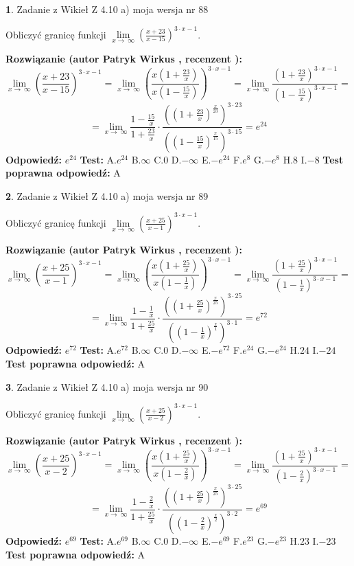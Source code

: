 \documentclass[12pt, a4paper]{article}
\theoremstyle{definition} %
\newtheorem{zad}{}
\newcommand{\zadStart}[1]{\begin{zad}#1\newline}
\newcommand{\zadStop}{\end{zad}}
\newcommand{\rozwStart}[2]{\noindent \textbf{Rozwiązanie (autor #1 , recenzent #2): }\newline}
\newcommand{\rozwStop}{\newline}
\newcommand{\odpStart}{\noindent \textbf{Odpowiedź:}\newline}
\newcommand{\odpStop}{\newline}
\newcommand{\testStart}{\noindent \textbf{Test:}\newline}
\newcommand{\testStop}{\newline}
\newcommand{\kluczStart}{\noindent \textbf{Test poprawna odpowiedź:}\newline}
\newcommand{\kluczStop}{\newline}
\begin{document}
\zadStart{Zadanie z Wikieł Z 4.10 a) moja wersja nr 88}

Obliczyć granicę funkcji  $\lim\limits_{x\to\ \infty}(\frac{x+23}{x-15})^{3\cdot x-1}$.
\zadStop
\rozwStart{Patryk Wirkus}{}
$$\lim\limits_{x\to\ \infty}(\frac{x+23}{x-15})^{3\cdot x-1} = \lim\limits_{x\to\ \infty}(\frac{x(1+\frac{23}{x})}{x(1-\frac{15}{x})})^{3\cdot x-1}=\lim\limits_{x\to\ \infty}\frac{(1+\frac{23}{x})^{3\cdot x-1}}{(1-\frac{15}{x})^{3\cdot x-1}}=$$
$$=\lim\limits_{x\to\ \infty}\frac{1-\frac{15}{x}}{1+\frac{23}{x}}\cdot\frac{((1+\frac{23}{x})^{\frac{x}{23}})^{3\cdot23}}{((1-\frac{15}{x})^{\frac{x}{15}})^{3\cdot15}}=e^{24}$$
\rozwStop
\odpStart
$e^{24}$
\odpStop
\testStart
A.$e^{24}$ B.$\infty$ C.$0$ D.$-\infty$ E.$-e^{24}$
F.$e^{8}$ G.$-e^{8}$
H.$8$
I.$-8$
\testStop
\kluczStart
A
\kluczStop



\zadStart{Zadanie z Wikieł Z 4.10 a) moja wersja nr 89}

Obliczyć granicę funkcji  $\lim\limits_{x\to\ \infty}(\frac{x+25}{x-1})^{3\cdot x-1}$.
\zadStop
\rozwStart{Patryk Wirkus}{}
$$\lim\limits_{x\to\ \infty}(\frac{x+25}{x-1})^{3\cdot x-1} = \lim\limits_{x\to\ \infty}(\frac{x(1+\frac{25}{x})}{x(1-\frac{1}{x})})^{3\cdot x-1}=\lim\limits_{x\to\ \infty}\frac{(1+\frac{25}{x})^{3\cdot x-1}}{(1-\frac{1}{x})^{3\cdot x-1}}=$$
$$=\lim\limits_{x\to\ \infty}\frac{1-\frac{1}{x}}{1+\frac{25}{x}}\cdot\frac{((1+\frac{25}{x})^{\frac{x}{25}})^{3\cdot25}}{((1-\frac{1}{x})^{\frac{x}{1}})^{3\cdot1}}=e^{72}$$
\rozwStop
\odpStart
$e^{72}$
\odpStop
\testStart
A.$e^{72}$ B.$\infty$ C.$0$ D.$-\infty$ E.$-e^{72}$
F.$e^{24}$ G.$-e^{24}$
H.$24$
I.$-24$
\testStop
\kluczStart
A
\kluczStop



\zadStart{Zadanie z Wikieł Z 4.10 a) moja wersja nr 90}

Obliczyć granicę funkcji  $\lim\limits_{x\to\ \infty}(\frac{x+25}{x-2})^{3\cdot x-1}$.
\zadStop
\rozwStart{Patryk Wirkus}{}
$$\lim\limits_{x\to\ \infty}(\frac{x+25}{x-2})^{3\cdot x-1} = \lim\limits_{x\to\ \infty}(\frac{x(1+\frac{25}{x})}{x(1-\frac{2}{x})})^{3\cdot x-1}=\lim\limits_{x\to\ \infty}\frac{(1+\frac{25}{x})^{3\cdot x-1}}{(1-\frac{2}{x})^{3\cdot x-1}}=$$
$$=\lim\limits_{x\to\ \infty}\frac{1-\frac{2}{x}}{1+\frac{25}{x}}\cdot\frac{((1+\frac{25}{x})^{\frac{x}{25}})^{3\cdot25}}{((1-\frac{2}{x})^{\frac{x}{2}})^{3\cdot2}}=e^{69}$$
\rozwStop
\odpStart
$e^{69}$
\odpStop
\testStart
A.$e^{69}$ B.$\infty$ C.$0$ D.$-\infty$ E.$-e^{69}$
F.$e^{23}$ G.$-e^{23}$
H.$23$
I.$-23$
\testStop
\kluczStart
A
\kluczStop
\end{document}
